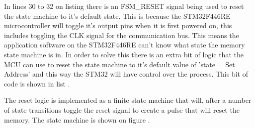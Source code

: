 In lines 30 to 32 on listing  there is an FSM\_RESET signal being used to reset the state machine to it's default state. This is because the STM32F446RE microcontroller will toggle it's output pins when it is first powered on, this includes toggling the CLK signal for the communication bus. This means the application software on the STM32F446RE can't know what state the memory state machine is in. In order to solve this there is an extra bit of logic that the MCU can use to reset the state machine to it's default value of 'state = Set Address' and this way the STM32 will have control over the process. This bit of code is shown in list . 



The reset logic is implemented as a finite state machine that will, after a number of state transitions toggle the reset signal to create a pulse that will reset the memory. The state machine is shown on figure . 


